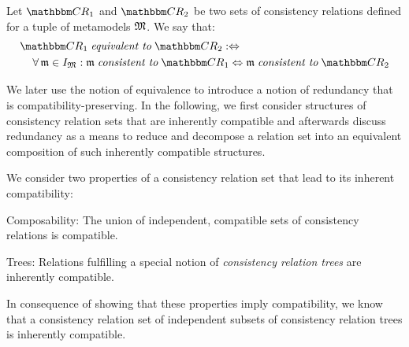 \begin{definition}
\label{def:equivalence}
    Let $\consistencyrelationset{CR}_{1}$ and $\consistencyrelationset{CR}_{2}$ be two sets of consistency relations defined for a tuple of metamodels $\metamodeltuple{M}$. %
    We say that:
    \begin{align*}
        &
        \consistencyrelationset{CR}_{1} \equivalenttomath \consistencyrelationset{CR}_{2} \equivalentperdefinition  \\
        & \formulaskip%
        \forall \modeltuple{m} \in \metamodeltupleinstanceset{M} : \modeltuple{m} \consistenttomath \consistencyrelationset{CR}_{1} \equivalent \modeltuple{m} \consistenttomath \consistencyrelationset{CR}_{2}
    \end{align*}
\end{definition}


We later use the notion of equivalence to introduce a notion of redundancy that is compatibility-preserving.
In the following, we first consider structures of consistency relation sets that are inherently compatible and afterwards discuss redundancy as a means to reduce and decompose a relation set into an equivalent composition of such inherently compatible structures.

We consider two properties of a consistency relation set that lead to its inherent compatibility:
\begin{properdescription}
    \item[Composability:] The union of independent, compatible sets of consistency relations is compatible.
    \item[Trees:] Relations fulfilling a special notion of \emph{consistency relation trees} are inherently compatible.
\end{properdescription}
In consequence of showing that these properties imply compatibility, we know that a consistency relation set of independent subsets of consistency relation trees is inherently compatible.


